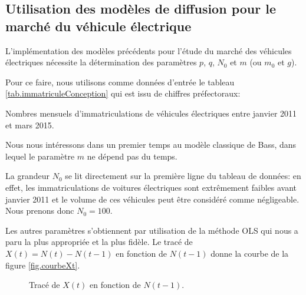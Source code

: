 	\subsection{Utilisation des modèles de diffusion pour le marché du véhicule électrique}

		L'implémentation des modèles précédents pour l'étude du marché des véhicules électriques nécessite la détermination des paramètres $p$, $q$, $N_0$ et $m$ (ou $m_0$ et $g$).

		Pour ce faire, nous utilisons comme données d'entrée le tableau \vref{tab.immatriculeConception} qui est issu de chiffres préfectoraux:
		
	
			
		\begin{table}[!h]
			\centering
			{\footnotesize
			}
			\caption{Nombres mensuels d'immatriculations de véhicules électriques entre janvier 2011 et mars 2015. \label{tab.immatriculeConception}}
		\end{table}

		Nous nous intéressons dans un premier temps au modèle classique de Bass, dans lequel le paramètre $m$ ne dépend pas du temps.

		La grandeur $N_0$ se lit directement sur la première ligne du tableau de données: en effet, les immatriculations de voitures électriques sont extrêmement faibles avant janvier 2011 et le volume de ces véhicules peut être considéré comme négligeable. Nous prenons donc $N_0 = 100$.

		Les autres paramètres s'obtiennent par utilisation de la méthode OLS qui nous a paru la plus appropriée et la plus fidèle. Le tracé de $X(t) = N(t) - N(t-1)$ en fonction de $N(t-1)$ donne la courbe de la figure \vref{fig.courbeXt}.
		
		\begin{figure}[!h]
			\centering
			\caption{Tracé de $X(t)$ en fonction de $N(t-1)$.\label{fig.courbeXt}}
		\end{figure}
		
